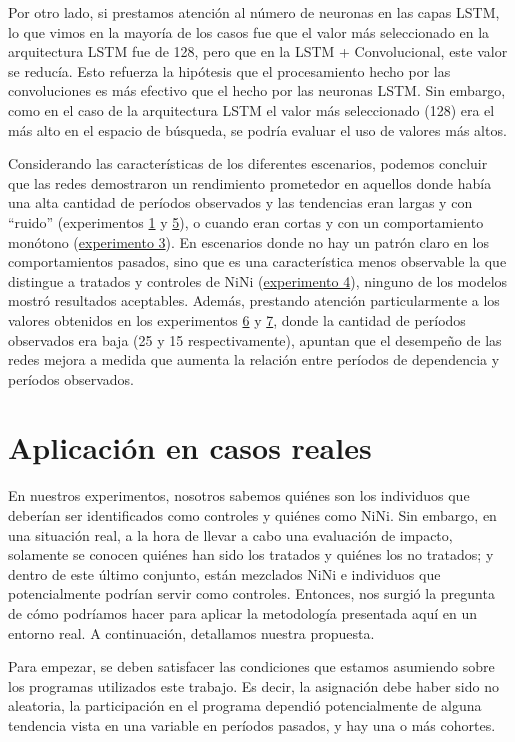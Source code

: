 \documentclass[../main.tex]{subfiles}
\begin{document}
Por otro lado, si prestamos atención al número de neuronas en las capas LSTM, lo que vimos
en la mayoría de los casos fue que el valor más seleccionado en la arquitectura LSTM fue
de 128, pero que en la LSTM + Convolucional, este valor se reducía. Esto refuerza la
hipótesis que el procesamiento hecho por las convoluciones es más efectivo que el hecho
por las neuronas LSTM. Sin embargo, como en el caso de la arquitectura LSTM el valor más
seleccionado (128) era el más alto en el espacio de búsqueda, se podría evaluar el uso de
valores más altos.

Considerando las características de los diferentes escenarios, podemos concluir que las
redes demostraron un rendimiento prometedor en aquellos donde había una alta cantidad de
períodos observados y las tendencias eran largas y con ``ruido'' (experimentos
\hyperref[sec:exp1]{1} y \hyperref[sec:exp5]{5}), o cuando eran cortas y con un
comportamiento monótono (\hyperref[sec:exp3]{experimento 3}). En escenarios donde no hay
un patrón claro en los comportamientos pasados, sino que es una característica menos
observable la que distingue a tratados y controles de NiNi
(\hyperref[sec:exp4]{experimento 4}), ninguno de los modelos mostró resultados aceptables.
Además, prestando atención particularmente a los valores obtenidos en los experimentos
\hyperref[sec:exp6]{6} y \hyperref[sec:exp7]{7}, donde la cantidad de períodos observados
era baja (25 y 15 respectivamente), apuntan que el desempeño de las redes mejora a medida
que aumenta la relación entre períodos de dependencia y períodos observados.

\section{Aplicación en casos reales}
En nuestros experimentos, nosotros sabemos quiénes son los individuos que deberían ser
identificados como controles y quiénes como NiNi. Sin embargo, en una situación real, a la
hora de llevar a cabo una evaluación de impacto, solamente se conocen quiénes han sido los
tratados y quiénes los no tratados; y dentro de este último conjunto, están mezclados NiNi
e individuos que potencialmente podrían servir como controles. Entonces, nos surgió la
pregunta de cómo podríamos hacer para aplicar la metodología presentada aquí en un entorno
real. A continuación, detallamos nuestra propuesta.

Para empezar, se deben satisfacer las condiciones que estamos asumiendo sobre los
programas utilizados este trabajo. Es decir, la asignación debe haber sido no aleatoria,
la participación en el programa dependió potencialmente de alguna tendencia vista en una
variable en períodos pasados, y hay una o más cohortes.
\end{document}
